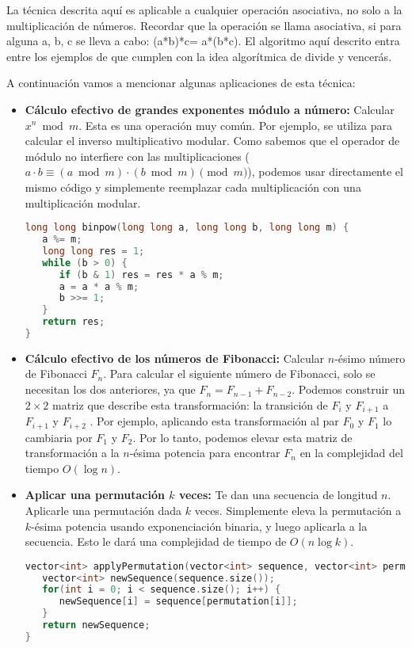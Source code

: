 La técnica descrita aquí es aplicable a cualquier operación asociativa, no solo a la multiplicación de números. Recordar que la operación se llama asociativa, si para alguna a, b, c se lleva a cabo: (a*b)*c= a*(b*c). El algoritmo aquí descrito entra entre los ejemplos de que cumplen con la idea algorítmica de divide y vencerás.

A continuación vamos a mencionar algunas aplicaciones de esta técnica:

\begin{itemize}
	\item \textbf{Cálculo efectivo de grandes exponentes módulo a número:} Calcular $x^n \bmod m$. Esta 
	es una operación muy común. Por ejemplo, se utiliza para calcular el inverso multiplicativo modular.  
	Como sabemos que el operador de módulo no interfiere con las multiplicaciones ($a \cdot b \equiv (a 
	\bmod m) \cdot (b \bmod m) \pmod m$), podemos usar directamente el mismo código y simplemente 
	reemplazar cada multiplicación con una multiplicación modular.
\begin{lstlisting}[language=C++]	
long long binpow(long long a, long long b, long long m) {
   a %= m;
   long long res = 1;
   while (b > 0) {
      if (b & 1) res = res * a % m;
      a = a * a % m;
      b >>= 1;
   }
   return res;
}
\end{lstlisting}
	\item \textbf{Cálculo efectivo de los números de Fibonacci:} Calcular $n$-ésimo número de 
	Fibonacci $F_n$. Para calcular el siguiente número de Fibonacci, solo se necesitan los dos 
	anteriores, ya que $F_n = F_{n-1} + F_{n-2}$. Podemos construir un $2 \times 2$ matriz que 
	describe esta transformación: la transición de $F_i$ y $F_{i+1}$ a $F_{i+1}$ y $F_{i+2}$ . Por 
	ejemplo, aplicando esta transformación al par $F_0$ y $F_1$ lo cambiaria por $F_1$ y $F_2$. Por lo 
	tanto, podemos elevar esta matriz de transformación a la $n$-ésima potencia para encontrar $F_n$ en la complejidad del tiempo $O(\log n)$.
	
	\item \textbf{Aplicar una permutación $k$ veces:} Te dan una secuencia de longitud $n$. Aplicarle 
	una permutación dada $k$ veces. Simplemente eleva la permutación a $k$-ésima potencia usando 
	exponenciación binaria, y luego aplicarla a la secuencia. Esto le dará una complejidad de tiempo de 
	$O(n \log k)$.
	
\begin{lstlisting}[language=C++]	
vector<int> applyPermutation(vector<int> sequence, vector<int> permutation) {
   vector<int> newSequence(sequence.size());
   for(int i = 0; i < sequence.size(); i++) {
      newSequence[i] = sequence[permutation[i]];
   }
   return newSequence;
}


\end{lstlisting}
\end{itemize}
